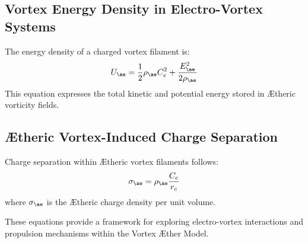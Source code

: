 \subsection{Vortex Energy Density in Electro-Vortex Systems}
The energy density of a charged vortex filament is:
\begin{equation}
    U_{\ae} = \frac{1}{2} \rho_{\text{\ae}} C_e^2 + \frac{E_{\ae}^2}{2 \rho_{\text{\ae}}}
\end{equation}
This equation expresses the total kinetic and potential energy stored in Ætheric vorticity fields.

\subsection{\AE theric Vortex-Induced Charge Separation}
Charge separation within Ætheric vortex filaments follows:
\begin{equation}
    \sigma_{\ae} = \rho_{\text{\ae}} \frac{C_e}{r_c}
\end{equation}
where $\sigma_{\ae}$ is the Ætheric charge density per unit volume.

These equations provide a framework for exploring electro-vortex interactions and propulsion mechanisms within the Vortex Æther Model.